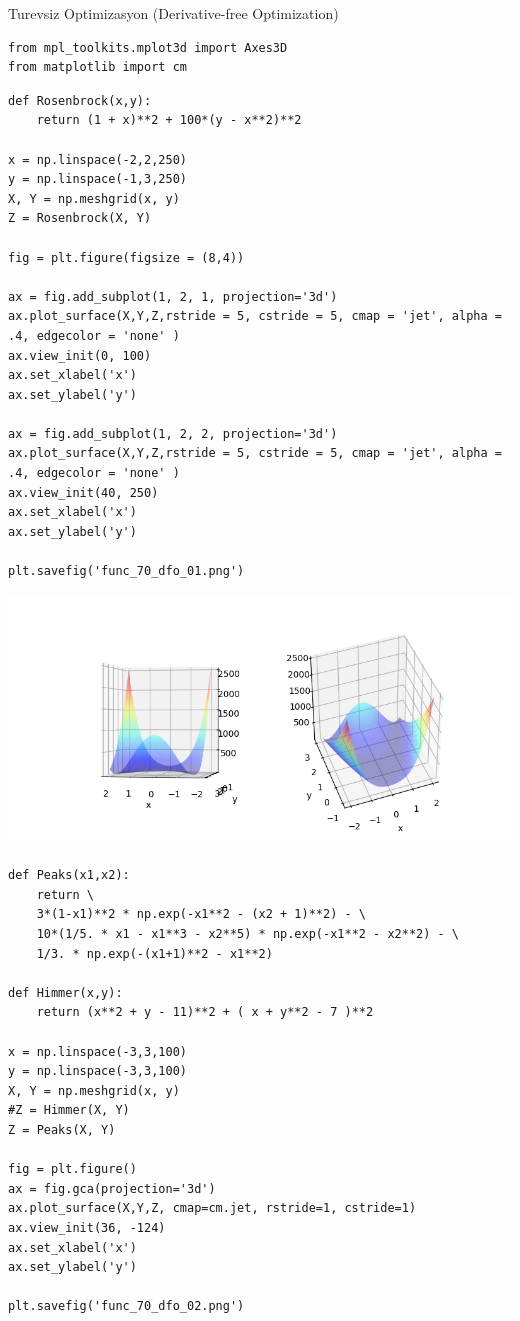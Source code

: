 \documentclass[12pt,fleqn]{article}\usepackage{../../common}
\begin{document}
Turevsiz Optimizasyon (Derivative-free Optimization)

\begin{verbatim}
from mpl_toolkits.mplot3d import Axes3D
from matplotlib import cm
\end{verbatim}


\begin{verbatim}
def Rosenbrock(x,y):
    return (1 + x)**2 + 100*(y - x**2)**2

x = np.linspace(-2,2,250)
y = np.linspace(-1,3,250)
X, Y = np.meshgrid(x, y)
Z = Rosenbrock(X, Y)

fig = plt.figure(figsize = (8,4))

ax = fig.add_subplot(1, 2, 1, projection='3d')
ax.plot_surface(X,Y,Z,rstride = 5, cstride = 5, cmap = 'jet', alpha = .4, edgecolor = 'none' )
ax.view_init(0, 100)
ax.set_xlabel('x')
ax.set_ylabel('y')

ax = fig.add_subplot(1, 2, 2, projection='3d')
ax.plot_surface(X,Y,Z,rstride = 5, cstride = 5, cmap = 'jet', alpha = .4, edgecolor = 'none' )
ax.view_init(40, 250)
ax.set_xlabel('x')
ax.set_ylabel('y')

plt.savefig('func_70_dfo_01.png')
\end{verbatim}

\includegraphics[width=35 em]{func_70_dfo_01.png}

\begin{verbatim}
def Peaks(x1,x2):
    return \
    3*(1-x1)**2 * np.exp(-x1**2 - (x2 + 1)**2) - \
    10*(1/5. * x1 - x1**3 - x2**5) * np.exp(-x1**2 - x2**2) - \
    1/3. * np.exp(-(x1+1)**2 - x1**2)

def Himmer(x,y):
    return (x**2 + y - 11)**2 + ( x + y**2 - 7 )**2

x = np.linspace(-3,3,100)
y = np.linspace(-3,3,100)
X, Y = np.meshgrid(x, y)
#Z = Himmer(X, Y)
Z = Peaks(X, Y)

fig = plt.figure()
ax = fig.gca(projection='3d')
ax.plot_surface(X,Y,Z, cmap=cm.jet, rstride=1, cstride=1)
ax.view_init(36, -124)
ax.set_xlabel('x')
ax.set_ylabel('y')

plt.savefig('func_70_dfo_02.png')
\end{verbatim}
\end{document}
